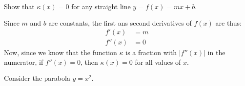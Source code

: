 \documentclass{exam}
\newcommand{\onestar}{\raisebox{0.05cm}{\resizebox{1.6cm}{!}{$\bigstar\largewhitestar\largewhitestar\largewhitestar$ \ }}}
\newcommand{\threestar}{\raisebox{0.05cm}{\resizebox{1.6cm}{!}{$\bigstar\bigstar\bigstar\largewhitestar$ \ }}}
\begin{document}
\begin{questions}\setcounter{question}{1}

\question \onestar Show that $\kappa(x)=0$ for any straight line $y=f(x)=mx+b$.


    \begin{solution}
    
    Since $m$ and $b$ are constants, the first ans second derivatives of $f(x)$ are thus:
   	\begin{align*}
   	f'(x) &= m \\
   	f''(x) &= 0
   	\end{align*}
   	Now, since we know that the function $\kappa$ is a fraction with $|f''(x)|$ in the numerator, if $f''(x) = 0$, then $\kappa(x) = 0$ for all values of $x$. 
    
    \end{solution}

    

\question \threestar Consider the parabola $y=x^2$.
\end{questions}
\end{document}
